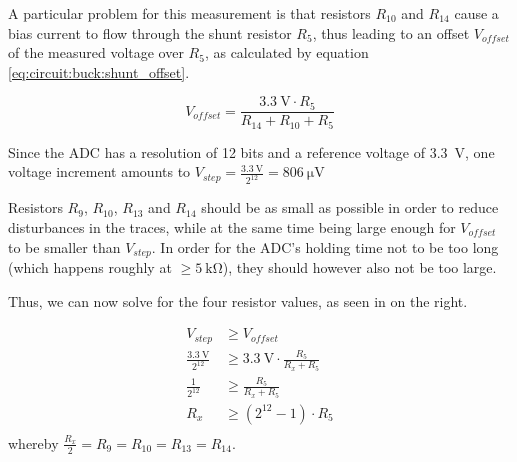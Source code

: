 \begin{minipage}{.50\textwidth}
A  particular problem  for this  measurement  is that  resistors $R_{10}$  and
$R_{14}$ cause a  bias current to flow through the  shunt resistor $R_5$, thus
leading  to an  offset $V_{offset}$  of the  measured voltage  over $R_5$,  as
calculated by equation \ref{eq:circuit:buck:shunt_offset}.
\end{minipage}
\begin{minipage}{.50\textwidth}
    \begin{equation}
        V_{offset} = \frac{ \SI{3.3}{\volt} \cdot R_5 }{ R_{14} + R_{10} + R_5 }
        \label{eq:circuit:buck:shunt_offset}
    \end{equation}
\end{minipage}

\begin{minipage}{.50\textwidth}
    Since  the  ADC  has  a  resolution   of  12  bits  and  a  reference  voltage
    of   \SI{3.3}{\volt},   one  voltage   increment   amounts   to  $V_{step}   =
    \frac{\SI{3.3}{\volt}}{2^{12}} = \SI{806}{\micro\volt}$

    Resistors  $R_9$, $R_{10}$, $R_{13}$ and  $R_{14}$  should be as small as possible %
    in order to  reduce disturbances in the  traces, while at the  same time being
    large enough for $V_{offset}$ to be  smaller than $V_{step}$. In order for the
    ADC's  holding  time not  to  be  too long  (which  happens  roughly at  $\geq      %
    \SI{5}{\kilo\ohm}$), they should however also not be too large.

    Thus, we can now  solve for the four resistor values,  as seen in on the right.
\end{minipage}
\begin{minipage}{.50\textwidth}


    \begin{align*}
                              V_{step} &\geq V_{offset} \\
        \frac{\SI{3.3}{\volt}}{2^{12}} &\geq \SI{3.3}{\volt} \cdot \frac{R_5}{R_x + R_5} \\
                      \frac{1}{2^{12}} &\geq \frac{R_5}{R_x + R_5} \\
                                   R_x &\geq \left( 2^{12} - 1 \right) \cdot R_5 \\
        \label{eq:solvethings}
    \end{align*}
    \hspace*{2em}whereby $\frac{R_x}{2} =  R_{9} = R_{10} = R_{13} =  R_{14}$.
\end{minipage}

